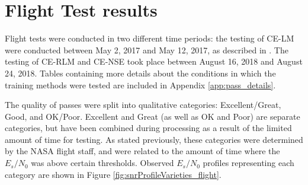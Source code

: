 \section{Flight Test results}
\par Flight tests were conducted in two different time periods: the testing of CE-LM were conducted between May 2, 2017 and May 12, 2017, as described in \cite{tim_implementation_paper}. The testing of CE-RLM and CE-NSE took place between August 16, 2018 and August 24, 2018. Tables containing more details about the conditions in which the training methods were tested are included in Appendix \ref{app:pass_details}. 
\par The quality of passes were split into qualitative categories: Excellent/Great, Good, and OK/Poor. Excellent and Great (as well as OK and Poor) are separate categories, but have been combined during processing as a result of the limited amount of time for testing. As stated previously, these categories were determined by the NASA flight staff, and were related to the amount of time where the $E_s/N_0$ was above certain thresholds. Observed $E_s/N_0$ profiles representing each category are shown in Figure \ref{fig:snrProfileVarieties_flight}.
